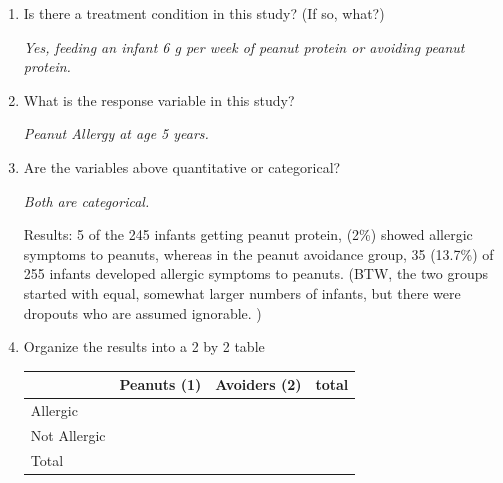 \begin{enumerate}
  \item  Is there a treatment condition in this study? (If so, what?)
\begin{students}
\vspace{2cm}
\end{students}

\begin{key}
  {\it Yes, feeding an infant 6 g per week of peanut protein or avoiding
    peanut protein. }
\end{key}


  \item  What is the response variable in this study?
\begin{students}
\vspace{2cm}
\end{students}

\begin{key}
  {\it  Peanut Allergy at age 5 years. }
\end{key}

  \item  Are the variables above quantitative or categorical?
\begin{students}
\vspace{2cm}
\end{students}

\begin{key}
  {\it  Both are categorical. }
\end{key}


Results: 5 of the 245 infants getting peanut protein,  (2\%)  showed
allergic symptoms to peanuts, whereas in the peanut
avoidance group, 35 (13.7\%) of 255 infants developed allergic
symptoms to peanuts. (BTW, the two groups started with equal, somewhat
larger numbers of infants, but there were dropouts who are assumed
ignorable. )


  \item \label{PnutTable} Organize the results into a 2 by 2 table
\begin{students}

{\Large
    \begin{tabular}[c]{|l|c|c|c|} \hline
        &Peanuts (1) & Avoiders (2) & total \\ \hline
Allergic    &   &   & \\ \hline
Not Allergic&   &   & \\ \hline
Total & & & \\ \hline
    \end{tabular} \vspace{1cm}
}
\end{students}
\begin{key}


\end{key}
\end{enumerate}
